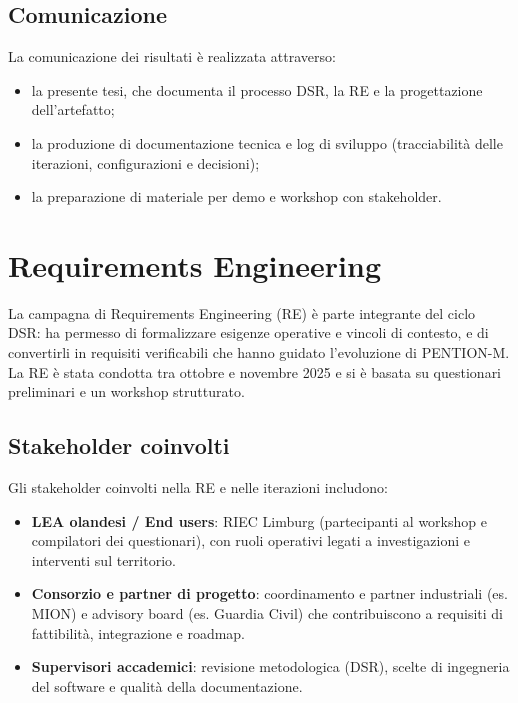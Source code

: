 \subsection{Comunicazione}
\label{subsec:communication}

La comunicazione dei risultati è realizzata attraverso:
\begin{itemize}
    \item la presente tesi, che documenta il processo DSR, la RE e la progettazione dell'artefatto;
    \item la produzione di documentazione tecnica e log di sviluppo (tracciabilità delle iterazioni, configurazioni e decisioni);
    \item la preparazione di materiale per demo e workshop con stakeholder.
\end{itemize}

\section{Requirements Engineering}
\label{sec:requirements_engineering}

La campagna di Requirements Engineering (RE) è parte integrante del ciclo DSR: ha permesso di formalizzare esigenze operative e vincoli di contesto, e di convertirli in requisiti verificabili che hanno guidato l'evoluzione di PENTION-M.
La RE è stata condotta tra ottobre e novembre 2025 e si è basata su questionari preliminari e un workshop strutturato.

\subsection{Stakeholder coinvolti}
\label{subsec:stakeholders}

Gli stakeholder coinvolti nella RE e nelle iterazioni includono:

\begin{itemize}
    \item \textbf{LEA olandesi / End users}: RIEC Limburg (partecipanti al workshop e compilatori dei questionari), con ruoli operativi legati a investigazioni e interventi sul territorio.
    \item \textbf{Consorzio e partner di progetto}: coordinamento e partner industriali (es. MION) e advisory board (es. Guardia Civil) che contribuiscono a requisiti di fattibilità, integrazione e roadmap.
    \item \textbf{Supervisori accademici}: revisione metodologica (DSR), scelte di ingegneria del software e qualità della documentazione.
\end{itemize}

